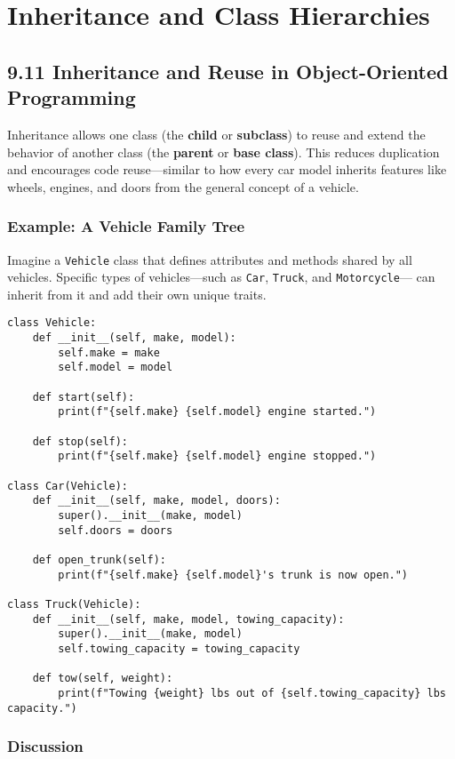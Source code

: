 \chapter{Inheritance and Class Hierarchies}

\section{9.11 Inheritance and Reuse in Object-Oriented Programming}

Inheritance allows one class (the \textbf{child} or \textbf{subclass}) to reuse and extend the
behavior of another class (the \textbf{parent} or \textbf{base class}). This reduces
duplication and encourages code reuse—similar to how every car model inherits features
like wheels, engines, and doors from the general concept of a vehicle.

\subsection*{Example: A Vehicle Family Tree}

Imagine a \texttt{Vehicle} class that defines attributes and methods shared by all vehicles.
Specific types of vehicles—such as \texttt{Car}, \texttt{Truck}, and \texttt{Motorcycle}—
can inherit from it and add their own unique traits.

\begin{verbatim}
class Vehicle:
    def __init__(self, make, model):
        self.make = make
        self.model = model
    
    def start(self):
        print(f"{self.make} {self.model} engine started.")
    
    def stop(self):
        print(f"{self.make} {self.model} engine stopped.")

class Car(Vehicle):
    def __init__(self, make, model, doors):
        super().__init__(make, model)
        self.doors = doors
    
    def open_trunk(self):
        print(f"{self.make} {self.model}'s trunk is now open.")

class Truck(Vehicle):
    def __init__(self, make, model, towing_capacity):
        super().__init__(make, model)
        self.towing_capacity = towing_capacity
    
    def tow(self, weight):
        print(f"Towing {weight} lbs out of {self.towing_capacity} lbs capacity.")
\end{verbatim}

\subsection*{Discussion}

